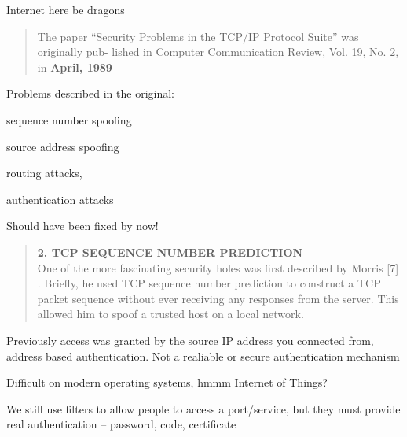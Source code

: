 \documentclass[Screen16to9,17pt]{foils}
\begin{document}


\vskip 2cm
\centerline{\Large Internet here be dragons}


\begin{quote}
The paper “Security Problems in the TCP/IP Protocol Suite” was originally pub-
lished in Computer Communication Review, Vol. 19, No. 2, in {\bf April, 1989}
\end{quote}

\begin{list1}
\item Problems described in the original:
\begin{list2}
\item sequence number spoofing
\item source address spoofing
\item routing attacks,
\item authentication attacks
\end{list2}
\end{list1}

\vskip 1cm
\centerline{\Large Should have been fixed by now!}


\vskip 5mm
\begin{quote}
{\bf 2. TCP SEQUENCE NUMBER PREDICTION}\\
One of the more fascinating security holes was first described by Morris [7] . Briefly, he used TCP
sequence number prediction to construct a TCP packet sequence without ever receiving any responses
from the server. This allowed him to spoof a trusted host on a local network.
\end{quote}

\begin{list2}
\item Previously access was granted by the source IP address you connected from, address based authentication. Not a realiable or secure authentication mechanism
\item Difficult on modern operating systems, hmmm Internet of Things?
\item We still use filters to allow people to access a port/service, but they must provide real authentication -- password, code, certificate
\end{list2}

\end{document}
